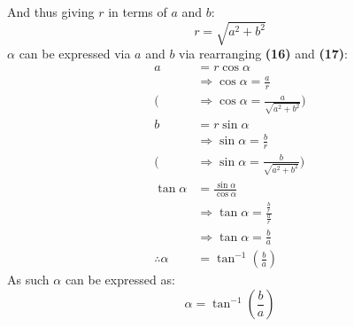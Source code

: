 \documentclass{article}
\begin{document}
        And thus giving $r$ in terms of $a$ and $b$:
        \begin{equation}
            r = \sqrt{a^2 + b^2}
        \end{equation}
        $\alpha$ can be expressed via $a$ and $b$ via rearranging \textbf{(16)} and \textbf{(17)}:
        \begin{align*}
            a &= r\cos\alpha \\
            &\Rightarrow \cos\alpha = \frac{a}{r} \\
            (&\Rightarrow \cos\alpha = \frac{a}{\sqrt{a^2 + b^2}}) \\
            b &= r\sin\alpha \\
            &\Rightarrow \sin\alpha = \frac{b}{r} \\
            (&\Rightarrow \sin\alpha = \frac{b}{\sqrt{a^2 + b^2}}) \\
            \tan\alpha &= \frac{\sin\alpha}{\cos\alpha} \\
            &\Rightarrow \tan\alpha = \frac{\frac{b}{r}}{\frac{a}{r}} \\
            &\Rightarrow \tan\alpha = \frac{b}{a} \\
            \therefore \alpha &= \tan^{-1}{\left( \frac{b}{a}\right) }
        \end{align*}
        As such $\alpha$ can be expressed as:
        \begin{equation}
            \alpha = \tan^{-1}{\left( \frac{b}{a}\right) }
        \end{equation}
    \newpage
    
\end{document}
